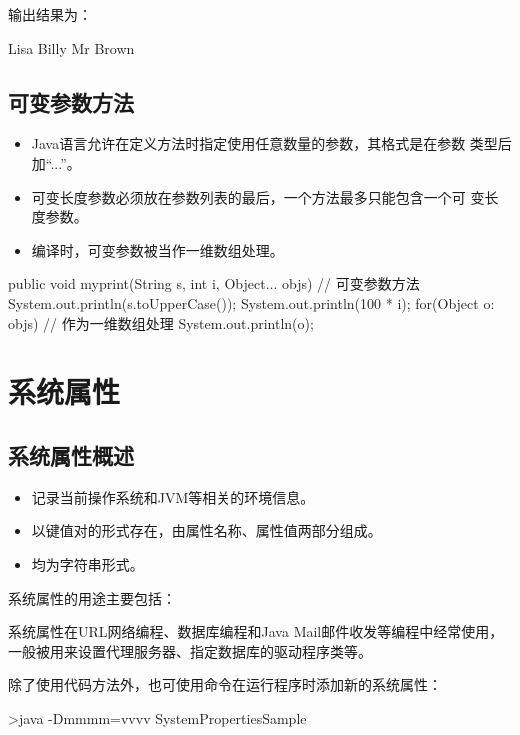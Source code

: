 输出结果为：

\begin{stdoutCode}
  Lisa
  Billy
  Mr Brown
\end{stdoutCode}


\subsection{可变参数方法}

\begin{itemize}
\item Java语言允许在定义方法时指定使用任意数量的参数，其格式是在参数
  类型后加“...”。
\item 可变长度参数必须放在参数列表的最后，一个方法最多只能包含一个可
  变长度参数。
\item 编译时，可变参数被当作{\Red\hei 一维数组处理}。
\end{itemize}

\begin{javaCode}
  public void myprint(String s, int i, Object... objs) { // 可变参数方法
    System.out.println(s.toUpperCase()); 
    System.out.println(100 * i);
    for(Object o: objs) { // 作为一维数组处理
      System.out.println(o); 
    }
  } 
\end{javaCode}


\section{系统属性}

\subsection{系统属性概述}

\begin{itemize}
\item 记录当前操作系统和JVM等相关的环境信息。
\item 以{\hei\Red 键值对}的形式存在，由{\hei\Red 属性名称、属性值}两部分组成。
\item 均为字符串形式。
\end{itemize}
  
系统属性的用途主要包括：

系统属性在URL网络编程、数据库编程和Java Mail邮件收发等编程中经常使用，
一般被用来设置代理服务器、指定数据库的驱动程序类等。

除了使用代码方法外，也可使用命令在运行程序时添加新的系统属性：
  
\begin{shCode}
  >java -Dmmmm=vvvv SystemPropertiesSample
\end{shCode}

